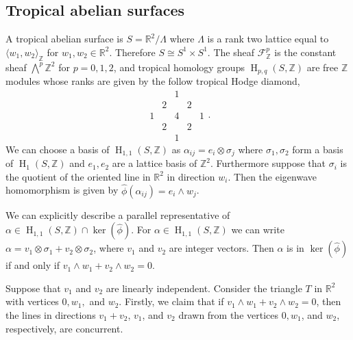 \documentclass[11pt]{article}
\numberwithin{equation}{numsection}
\newcommand{\Z}{{\mathbb Z}}
\newcommand{\R}{{\mathbb R}}
\DeclareMathOperator{\HH}{H}
\begin{document}






\subsection{Tropical abelian surfaces}
A tropical abelian surface is $S = \R^2 /\Lambda$ where $\Lambda$ is a rank two lattice 
equal to $ \langle w_1, w_2 \rangle_{\Z}$ for $w_1, w_2 \in \R^2$. 
Therefore $S \cong S^1 \times S^1$.
The sheaf $\mathcal{F}_{\Z}^p$ is the constant sheaf $\bigwedge^p\Z^2$ for $p = 0, 1, 2$, 
and tropical homology groups $\HH_{p, q}(S, \Z)$ are free $\Z$ modules whose ranks are given by the follow tropical Hodge diamond, 
$$\begin{array}{ccccc} &  & 1 &  &  \\ & 2 &  & 2 &  \\1 &  & 4 &  & 1 \\  & 2 &  & 2 &   \\  &  & 1 &  & \end{array}.$$
We can choose a basis of $\HH_{1, 1}(S, \Z)$ as $\alpha_{ij} = e_i \otimes \sigma_j$ 
where $\sigma_1, \sigma_2$ form a basis of $\HH_{1}(S, \Z)$ and $e_1, e_2$ are a lattice basis of $\Z^2$.  
Furthermore suppose that $\sigma_i$ is the quotient of the oriented line in $\R^2$ in direction $w_i$. 
Then the eigenwave homomorphism is given by $\hat{\phi} (\alpha_{ij}) = e_i \wedge w_j$. 

We can explicitly describe a parallel representative of $\alpha \in \HH_{1, 1}(S, \Z) \cap \ker(\hat \phi)$. 
For $\alpha \in \HH_{1, 1}(S, \Z)$ we can write $\alpha = v_1 \otimes \sigma_1 + v_2 \otimes \sigma_2$, 
where $v_1$ and $v_2$ are integer vectors. 
Then $\alpha $ is in $\ker(\hat \phi)$ if and only if $v_1 \wedge w_1 + v_2 \wedge w_2 = 0$. 

Suppose that $v_1$ and $v_2$ are linearly independent. 
Consider the triangle  $T$ in $\R^2$ with vertices $0, w_1,$ and $w_2$. 
Firstly, we claim that if $v_1 \wedge w_1 + v_2 \wedge w_2 = 0$, 
then the lines in directions $v_1 + v_2$, $v_1$, and $v_2$ drawn from the vertices 
$0, w_1$, and $w_2$, respectively, are concurrent. 
\end{document}
